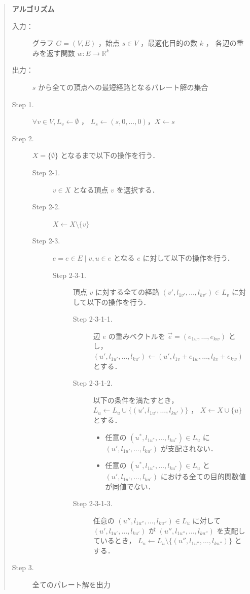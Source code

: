 \documentclass[12pt]{optlab-bachelor}
\begin{document}
\begin{quote}
  \textbf{アルゴリズム}
  \begin{description}
    \item[入力：] グラフ $G=(V,E)$ ，始点 $s \in V$ ，最適化目的の数 $k$ ，
    各辺の重みを返す関数 $w : E \to \mathbb{R}^k$
    \item[出力：] $s$ から全ての頂点への最短経路となるパレート解の集合
    \item[Step 1.] $\forall v \in V , L_v \leftarrow \emptyset$ ，
    $L_s \leftarrow (s,0,\ldots,0)$，$X \leftarrow s$
    \item[Step 2.] $X = \{\emptyset\}$ となるまで以下の操作を行う．
    \begin{description}
      \item[Step 2-1.] $v \in X$ となる頂点 $v$ を選択する．
      \item[Step 2-2.] $X \leftarrow X \setminus \{ v \}$
      \item[Step 2-3.] $e = {e \in E \mid v,u \in e}$ となる
      $e$ に対して以下の操作を行う．
      \begin{description}
        \item[Step 2-3-1.] 頂点 $v$ に対する全ての経路
        $(v',l_{1v'},\ldots,l_{kv'}) \in L_v$ に対して以下の操作を行う．
        \begin{description}
          \item[Step 2-3-1-1.] 辺 $e$ の重みベクトルを
          $\vec{e} = (e_{1w},\ldots,e_{kw})$ とし，
          $(u',l_{1u'},\ldots,l_{ku'}) \leftarrow
          (u',l_{1v}+e_{1w},\ldots,l_{kv}+e_{kw})$ とする．
          \item[Step 2-3-1-2.] 以下の条件を満たすとき，
          $L_u \leftarrow L_u \cup \{(u',l_{1u'},\ldots,l_{ku'})\}$ ，
          $X \leftarrow X \cup \{ u\}$ とする．
          \begin{itemize}
            \item 任意の $(u^*,l_{1u^*},\ldots,l_{ku^*})\in L_u$ に
            $(u',l_{1u'},\ldots,l_{ku'})$ が支配されない．
            \item 任意の $(u^*,l_{1u^*},\ldots,l_{ku^*}) \in L_u$ と
            $(u',l_{1u'},\ldots,l_{ku'})$ における全ての目的関数値が同値でない．
          \end{itemize}
          \item[Step 2-3-1-3.] 任意の $(u'',l_{1u''},\ldots,l_{ku''})\in L_u$
          に対して$(u',l_{1u'},\ldots,l_{ku'})$ が
          $(u'',l_{1u''},\ldots,l_{ku''})$ を支配しているとき，
          $L_u \leftarrow L_u \setminus \{(u'',l_{1u''},\ldots,l_{ku''})\}$ とする．
        \end{description}
      \end{description}
    \end{description}
    \item[Step 3.] 全てのパレート解を出力
  \end{description}
\end{quote}
\end{document}
